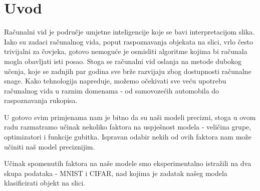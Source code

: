 \chapter{Uvod}

Računalni vid je područje umjetne inteligencije koje se bavi interpretacijom slika. Iako su zadaci računalnog vida, poput raspoznavanja objekata na slici, vrlo često trivijalni za čovjeka, gotovo nemoguće je osmisliti algoritme kojima bi računala mogla obavljati isti posao. Stoga se računalni vid oslanja na metode dubokog učenja, koje se zadnjih par godina sve brže razvijaju zbog dostupnosti računalne snage. Kako tehnologija napreduje, možemo očekivati sve veću upotrebu računalnog vida u raznim domenama - od samovozećih automobila do raspoznavanja rukopisa. 

U gotovo svim primjenama nam je bitno da su naši modeli precizni, stoga u ovom radu razmatramo učinak nekoliko faktora na uspješnost modela - veličina grupe, optimizatori i funkcije gubitka. Ispravan odabir nekih od ovih faktora nam može učiniti naš model preciznijim.

Učinak spomenutih faktora na naše modele smo eksperimentalno istražili na dva skupa podataka - MNIST i CIFAR, nad kojima je zadatak našeg modela klasificirati objekt na slici. 